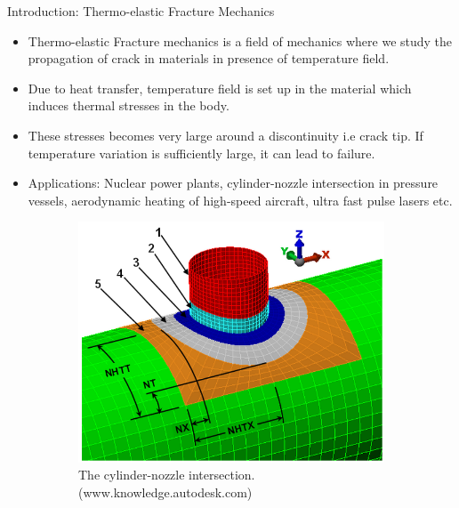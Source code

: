 \documentclass{beamer}
\begin{document}
\begin{frame}[t,fragile]{Introduction: Thermo-elastic Fracture Mechanics}
    \vspace{-.3cm}
    \footnotesize
    \begin{itemize}
        \item Thermo-elastic Fracture mechanics is a field of mechanics where we study the propagation of crack in materials in presence of temperature field.
        \item Due to heat transfer, temperature field is set up in the material which induces thermal stresses in the body. 
\item These stresses becomes very large around a discontinuity i.e crack tip. If temperature variation is sufficiently large, it can lead to failure.
        \item Applications: Nuclear power plants, cylinder-nozzle
 intersection in pressure vessels, aerodynamic heating of high-speed aircraft, ultra fast pulse lasers etc.
   \end{itemize}
   \vspace{-.5cm}
\begin{figure}[H]
    \hspace{.7cm}
      \begin{subfigure}{0.45\textwidth}
    \centering
 \includegraphics[scale=.1]{cyl.png}
 \caption{\tiny{The cylinder-nozzle intersection. (www.knowledge.autodesk.com)}}
 \label{cyl}
 \end{subfigure}
\begin{subfigure}{0.45\textwidth}
    \centering

\end{subfigure}
\end{figure}
\end{frame}
\end{document}
